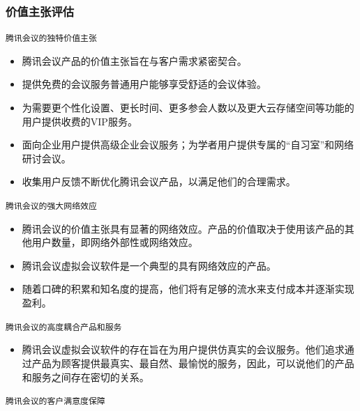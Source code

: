 \documentclass[a4paper,12pt]{article}
\begin{document}
    \subsubsection{价值主张评估}
    \texttt{腾讯会议的独特价值主张}

\begin{itemize}
  \item 腾讯会议产品的价值主张旨在与客户需求紧密契合。
  
  \item 提供免费的会议服务普通用户能够享受舒适的会议体验。
  
  \item 为需要更个性化设置、更长时间、更多参会人数以及更大云存储空间等功能的用户提供收费的VIP服务。
  
  \item 面向企业用户提供高级企业会议服务；为学者用户提供专属的“自习室”和网络研讨会议。
  
  \item 收集用户反馈不断优化腾讯会议产品，以满足他们的合理需求。
\end{itemize}

\texttt{腾讯会议的强大网络效应}

\begin{itemize}
  \item 腾讯会议的价值主张具有显著的网络效应。产品的价值取决于使用该产品的其他用户数量，即网络外部性或网络效应。
  
  \item 腾讯会议虚拟会议软件是一个典型的具有网络效应的产品。
  
  \item 随着口碑的积累和知名度的提高，他们将有足够的流水来支付成本并逐渐实现盈利。
  
\end{itemize}

\texttt{腾讯会议的高度耦合产品和服务}

\begin{itemize}
  \item 腾讯会议虚拟会议软件的存在旨在为用户提供仿真实的会议服务。他们追求通过产品为顾客提供最真实、最自然、最愉悦的服务，因此，可以说他们的产品和服务之间存在密切的关系。
\end{itemize}

\texttt{腾讯会议的客户满意度保障}
\end{document}
